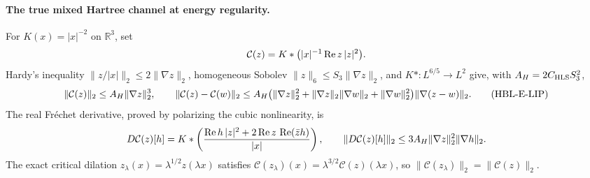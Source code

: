 \paragraph{The true mixed Hartree channel at energy regularity.}
For \(K(x)=|x|^{-2}\) on \(\mathbb R^3\), set
\[
 {\cal C}(z)=K*\bigl(|x|^{-1}\operatorname{Re}z\,|z|^2\bigr).
\]
Hardy's inequality \(\|z/|x|\|_2\le2\|\nabla z\|_2\),
homogeneous Sobolev \(\|z\|_6\le S_3\|\nabla z\|_2\), and
\(K*:L^{6/5}\to L^2\) give, with \(A_H=2C_{\rm HLS}S_3^2\),
\[
 \|{\cal C}(z)\|_2\le A_H\|\nabla z\|_2^3,
 \qquad
 \|{\cal C}(z)-{\cal C}(w)\|_2
 \le A_H\bigl(\|\nabla z\|_2^2+
 \|\nabla z\|_2\|\nabla w\|_2+\|\nabla w\|_2^2\bigr)
 \|\nabla(z-w)\|_2.
 \tag{HBL-E-LIP}
\]
The real Fr\'echet derivative, proved by polarizing the cubic
nonlinearity, is
\[
 D{\cal C}(z)[h]=K*\left(
 \frac{\operatorname{Re}h\,|z|^2+
  2\operatorname{Re}z\,\operatorname{Re}(\bar z h)}{|x|}
 \right),\qquad
 \|D{\cal C}(z)[h]\|_2\le3A_H\|\nabla z\|_2^2\|\nabla h\|_2.
\]
The exact critical dilation
\(z_\lambda(x)=\lambda^{1/2}z(\lambda x)\) satisfies
\(\mathcal C(z_\lambda)(x)=\lambda^{3/2}\mathcal C(z)(\lambda x)\),
so \(\|\mathcal C(z_\lambda)\|_2=\|\mathcal C(z)\|_2\).


